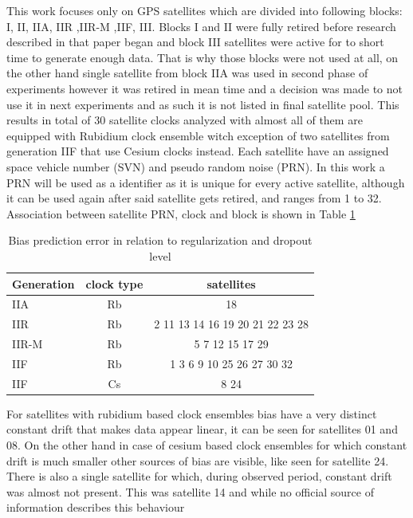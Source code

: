 This work focuses only on GPS satellites which are divided into following blocks:
I, II, IIA, IIR ,IIR-M ,IIF, III.
Blocks I and II were fully retired before research described in that paper began and block
III satellites were active for to short time to generate enough data.
That is why those blocks were not used at all, on the other hand single satellite from block
IIA was used in second phase of experiments however it was retired in mean time and a decision
was made to not use it in next experiments and as such it is not listed in final satellite pool.
This results in total of 30 satellite clocks analyzed with almost all of them are equipped 
with Rubidium clock ensemble witch exception of two satellites from generation IIF 
that use Cesium clocks instead.
Each satellite have an assigned space vehicle number (SVN) and pseudo random noise (PRN).
In this work a PRN will be used as a identifier as it is unique for every active satellite, 
although it can be used again after said satellite gets retired, and ranges from 1 to 32.
Association between satellite PRN, clock and block is shown in Table \ref{table:prn}
\begin{table}[htb] \label{table:prn}
\parindent0pt
\caption{Bias prediction error in relation to regularization and dropout level}
\centering
\begin{tabular}{ l  c  c }
  \hline
  \hline
  Generation& clock type& satellites\\  \hline
  IIA & Rb& 18\\  
  IIR & Rb& 2 11 13 14 16 19 20 21 22 23 28\\ 
  IIR-M & Rb& 5 7 12 15 17 29\\ 
  IIF & Rb& 1 3 6 9 10 25 26 27 30 32\\ 
  IIF & Cs& 8 24 \\ \hline \hline
 \end{tabular}
\end{table}
For satellites with rubidium based clock ensembles bias have a very distinct constant drift
that makes data appear linear, it can be seen for satellites 01 and 08. 
On the other hand in case of cesium based clock ensembles for which constant drift is much 
smaller other sources of bias are visible, like seen for satellite 24.
There is also a single satellite for which, during observed period, constant drift was almost
not present. This was satellite 14 and while no official source of information describes this 
behaviour

